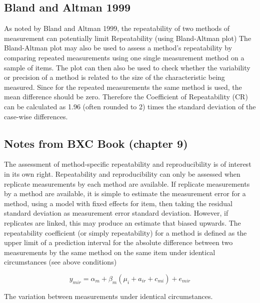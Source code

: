 \documentclass[12pt, a4paper]{article}
\begin{document}
\subsection{Bland and Altman 1999}
As noted by Bland and Altman 1999, the repeatability of two methods of measurement can  potentially limit
Repeatability (using Bland-Altman plot)
The Bland-Altman plot may also be used to assess a method’s repeatability by comparing repeated measurements using one single measurement method on a sample of items.
The plot can then also be used to check whether the variability or precision of a method is related to the size of the characteristic being measured.
Since for the repeated measurements the same method is used, the mean difference should be zero.
Therefore the Coefficient of Repeatability (CR) can be calculated as 1.96 (often rounded to 2) times the standard deviation of the case-wise differences.

\subsection{Notes from BXC Book (chapter 9)}
The assessment of method-specific repeatability and reproducibility is of interest in its own right.
Repeatability and reproducibility can only be assessed when replicate measurements by each method are available.
If replicate measurements by a method are available, it is simple to estimate the measurement error for a method, using a model with fixed effects for item, then taking the residual standard deviation as measurement error standard deviation.
However, if replicates are linked, this may produce an estimate that biased upwards.
The repeatability coefficient (or simply repeatability) for a method is defined as the upper limit of a
prediction interval for the absolute difference between two measurements by the same method on the same
item under identical circumstances (see above conditions)

\[y_{mir}  = \alpha_{m} + \beta_m( \mu_i + a_{ir} + c_{mi}) + e_{mir}\]

The variation between measurements under identical circumstances.








\end{document}

